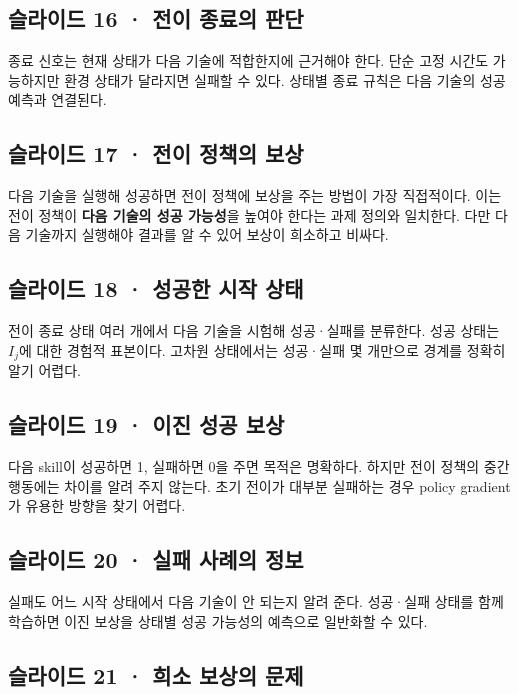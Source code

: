 \documentclass[11pt,a4paper]{article}
\begin{document}
\subsection{슬라이드 16 · 전이 종료의 판단}

종료 신호는 현재 상태가 다음 기술에 적합한지에 근거해야 한다. 단순 고정 시간도 가능하지만 환경 상태가 달라지면 실패할 수 있다. 상태별 종료 규칙은 다음 기술의 성공 예측과 연결된다.\par

\subsection{슬라이드 17 · 전이 정책의 보상}

다음 기술을 실행해 성공하면 전이 정책에 보상을 주는 방법이 가장 직접적이다. 이는 전이 정책이 \textbf{다음 기술의 성공 가능성}을 높여야 한다는 과제 정의와 일치한다. 다만 다음 기술까지 실행해야 결과를 알 수 있어 보상이 희소하고 비싸다.\par

\subsection{슬라이드 18 · 성공한 시작 상태}

전이 종료 상태 여러 개에서 다음 기술을 시험해 성공·실패를 분류한다. 성공 상태는 $I_j$에 대한 경험적 표본이다. 고차원 상태에서는 성공·실패 몇 개만으로 경계를 정확히 알기 어렵다.\par

\subsection{슬라이드 19 · 이진 성공 보상}

다음 skill이 성공하면 1, 실패하면 0을 주면 목적은 명확하다. 하지만 전이 정책의 중간 행동에는 차이를 알려 주지 않는다. 초기 전이가 대부분 실패하는 경우 policy gradient가 유용한 방향을 찾기 어렵다.\par

\subsection{슬라이드 20 · 실패 사례의 정보}

실패도 어느 시작 상태에서 다음 기술이 안 되는지 알려 준다. 성공·실패 상태를 함께 학습하면 이진 보상을 상태별 성공 가능성의 예측으로 일반화할 수 있다.\par

\subsection{슬라이드 21 · 희소 보상의 문제}
\end{document}
